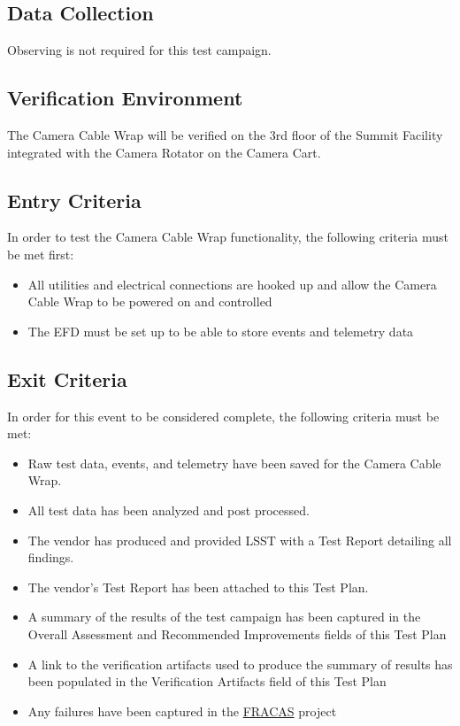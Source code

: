 \documentclass[SE,lsstdraft,STR,toc]{lsstdoc}
\providecommand{\tightlist}{
  \setlength{\itemsep}{0pt}\setlength{\parskip}{0pt}}
\begin{document}
\subsection{Data Collection}

  Observing is not required for this test campaign.

\subsection{Verification Environment}
\label{sect:hwconf}
   The Camera Cable Wrap will be verified on the 3rd floor of the Summit
Facility integrated with the Camera Rotator on the Camera Cart.


  \subsection{Entry Criteria}
   In order to test the Camera Cable Wrap functionality, the following
criteria must be met first:

\begin{itemize}
\tightlist
\item
  All utilities and electrical connections are hooked up and allow the
  Camera Cable Wrap to be powered on and controlled
\item
  The EFD must be set up to be able to store events and telemetry data
\end{itemize}


  \subsection{Exit Criteria}
   In order for this event to be considered complete, the following
criteria must be met:

\begin{itemize}
\tightlist
\item
  Raw test data, events, and telemetry have been saved for the Camera
  Cable Wrap.
\item
  All test data has been analyzed and post processed.
\item
  The vendor has produced and provided LSST with a Test Report detailing
  all findings.
\item
  The vendor's Test Report has been attached to this Test Plan.
\item
  A summary of the results of the test campaign has been captured in the
  Overall Assessment and Recommended Improvements fields of this Test
  Plan
\item
  A link to the verification artifacts used to produce the summary of
  results has been populated in the Verification Artifacts field of this
  Test Plan
\item
  Any failures have been captured in the
  \href{https://jira.lsstcorp.org/projects/FRACAS/issues/}{FRACAS}
  project
\end{itemize}
\end{document}
